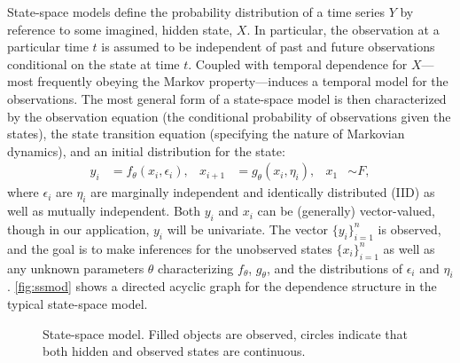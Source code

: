 \documentclass[12pt]{article}
\begin{document}
State-space models define the probability distribution of a time 
series $Y$ by reference to some imagined, hidden state, $X$. In
particular, the observation at a particular time $t$ is assumed to be
independent of past and future observations conditional on the state
at time $t$. Coupled with temporal dependence for $X$---most
frequently obeying the Markov property---induces a temporal model for
the observations.  The most general form of a state-space model is
then characterized by the 
observation equation (the conditional probability of observations
given the states),
the state transition equation (specifying the nature of Markovian
dynamics), and an initial distribution for the state: 
\begin{equation}
\begin{aligned}
  y_i &= f_\theta(x_i,\epsilon_i), &
  x_{i+1} &= g_\theta(x_i,\eta_i), &
  x_1 &\sim F,
\end{aligned}
\label{eq:ssmod}
\end{equation}
where $\epsilon_i$ are $\eta_i$ are marginally independent and
identically distributed (IID) as well as mutually independent. Both
$y_i$ and $x_i$ can be (generally) vector-valued, though in our
application, $y_i$ will be univariate. The
vector $\{y_i\}_{i=1}^n$ is observed, and the goal is to make
inferences for the unobserved states $\{x_i\}_{i=1}^n$ as well as any
unknown parameters $\theta$ characterizing $f_\theta$, $g_\theta$, and
the distributions of $\epsilon_i$ and $\eta_i$.  \autoref{fig:ssmod}
shows a directed acyclic graph for the dependence structure in the
typical state-space model.

\begin{figure}
  \centering
  \caption{State-space model. Filled objects are observed, circles
    indicate that both hidden and observed states are
    continuous.\label{fig:ssmod}} 
\end{figure}
\end{document}
